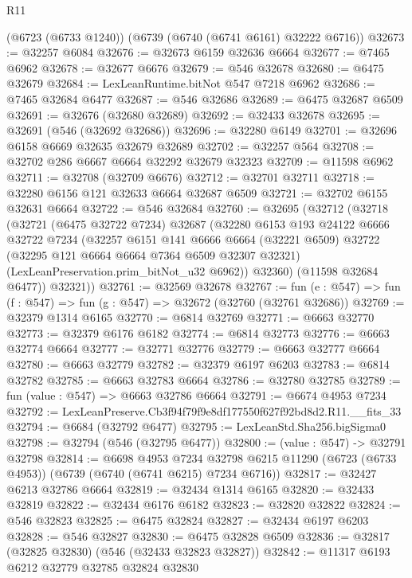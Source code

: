 \begin{lexlean}{R11}
\begin{coremodule}
    (@6723 (@6733 @1240))
    (@6739 (@6740 (@6741 @6161) @32222 @6716))
@32673 := @32257 @6084
@32676 := @32673 @6159 @32636 @6664
@32677 := @7465 @6962
@32678 := @32677 @6676
@32679 := @546 @32678
@32680 := @6475 @32679
@32684 := LexLeanRuntime.bitNot @547 @7218 @6962
@32686 := @7465 @32684 @6477
@32687 := @546 @32686
@32689 := @6475 @32687 @6509
@32691 := @32676 (@32680 @32689)
@32692 := @32433 @32678
@32695 := @32691 (@546 (@32692 @32686))
@32696 := @32280 @6149
@32701 := @32696 @6158 @6669 @32635 @32679 @32689
@32702 := @32257 @564
@32708 := @32702 @286 @6667 @6664 @32292 @32679 @32323
@32709 := @11598 @6962
@32711 := @32708 (@32709 @6676)
@32712 := @32701 @32711
@32718 := @32280 @6156 @121 @32633 @6664 @32687 @6509
@32721 := @32702 @6155 @32631 @6664
@32722 := @546 @32684
@32760 := @32695
    (@32712
      (@32718
        (@32721
          (@6475 @32722 @7234)
          @32687
          (@32280
            @6153
            @193
            @24122
            @6666
            @32722
            @7234
            (@32257
              @6151
              @141
              @6666
              @6664
              (@32221 @6509)
              @32722
              (@32295 @121 @6664 @6664 @7364 @6509 @32307 @32321)
              (LexLeanPreservation.prim_bitNot_u32 @6962))
            @32360)
          (@11598 @32684 @6477))
        @32321))
@32761 := @32569 @32678
@32767 := fun (e : @547) => fun (f : @547) => fun (g : @547) => @32672 (@32760 (@32761 @32686))
@32769 := @32379 @1314 @6165
@32770 := @6814 @32769
@32771 := @6663 @32770
@32773 := @32379 @6176 @6182
@32774 := @6814 @32773
@32776 := @6663 @32774 @6664
@32777 := @32771 @32776
@32779 := @6663 @32777 @6664
@32780 := @6663 @32779
@32782 := @32379 @6197 @6203
@32783 := @6814 @32782
@32785 := @6663 @32783 @6664
@32786 := @32780 @32785
@32789 := fun (value : @547) => @6663 @32786 @6664
@32791 := @6674 @4953 @7234
@32792 := LexLeanPreserve.Cb3f94f79f9e8df177550f627f92bd8d2.R11.__fits_33
@32794 := @6684 (@32792 @6477)
@32795 := LexLeanStd.Sha256.bigSigma0
@32798 := @32794 (@546 (@32795 @6477))
@32800 := (value : @547) -> @32791 @32798
@32814 := @6698
    @4953
    @7234
    @32798
    @6215
    @11290
    (@6723 (@6733 @4953))
    (@6739 (@6740 (@6741 @6215) @7234 @6716))
@32817 := @32427 @6213 @32786 @6664
@32819 := @32434 @1314 @6165
@32820 := @32433 @32819
@32822 := @32434 @6176 @6182
@32823 := @32820 @32822
@32824 := @546 @32823
@32825 := @6475 @32824
@32827 := @32434 @6197 @6203
@32828 := @546 @32827
@32830 := @6475 @32828 @6509
@32836 := @32817 (@32825 @32830) (@546 (@32433 @32823 @32827))
@32842 := @11317 @6193 @6212 @32779 @32785 @32824 @32830

\end{coremodule}
\end{lexlean}
